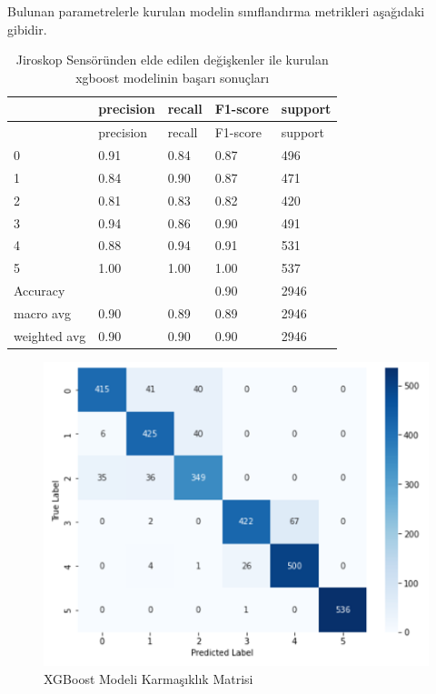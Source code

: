 \documentclass[12pt,twoside]{deuthesis}
\begin{document}
Bulunan parametrelerle kurulan modelin sınıflandırma metrikleri aşağıdaki gibidir.
\begin{longtable}[]{@{}lllll@{}}
\caption{\label{tab:jxgboost} Jiroskop Sensöründen elde edilen değişkenler ile kurulan xgboost modelinin başarı sonuçları}\tabularnewline
\toprule()
& precision & recall & F1-score & support \\
\midrule()
\endfirsthead
\toprule()
& precision & recall & F1-score & support \\
\midrule()
\endhead
0 & 0.91 & 0.84 & 0.87 & 496 \\
1 & 0.84 & 0.90 & 0.87 & 471 \\
2 & 0.81 & 0.83 & 0.82 & 420 \\
3 & 0.94 & 0.86 & 0.90 & 491 \\
4 & 0.88 & 0.94 & 0.91 & 531 \\
5 & 1.00 & 1.00 & 1.00 & 537 \\
Accuracy & & & 0.90 & 2946 \\
macro avg & 0.90 & 0.89 & 0.89 & 2946 \\
weighted avg & 0.90 & 0.90 & 0.90 & 2946 \\
\bottomrule()
\end{longtable}
\begin{figure}

{\centering \includegraphics[width=0.9\linewidth,height=0.35\textheight]{figure/xgboost_confmat} 

}

\caption{XGBoost Modeli Karmaşıklık Matrisi}\label{fig:xgboostconfmat}
\end{figure}
\end{document}
